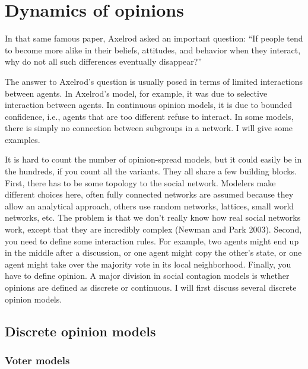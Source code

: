 \documentclass[
  a4paper,
  DIV=11,
  numbers=noendperiod,
  oneside]{scrreprt}
\begin{document}
\hypertarget{sec-Dynamics-of-opinions}{%
\section{Dynamics of opinions}\label{sec-Dynamics-of-opinions}}

In that same famous paper, Axelrod asked an important question: ``If
people tend to become more alike in their beliefs, attitudes, and
behavior when they interact, why do not all such differences eventually
disappear?''

The answer to Axelrod's question is usually posed in terms of limited
interactions between agents. In Axelrod's model, for example, it was due
to selective interaction between agents. In continuous opinion models,
it is due to bounded confidence, i.e., agents that are too different
refuse to interact. In some models, there is simply no connection
between subgroups in a network. I will give some examples.

It is hard to count the number of opinion-spread models, but it could
easily be in the hundreds, if you count all the variants. They all share
a few building blocks. First, there has to be some topology to the
social network. Modelers make different choices here, often fully
connected networks are assumed because they allow an analytical
approach, others use random networks, lattices, small world networks,
etc. The problem is that we don't really know how real social networks
work, except that they are incredibly complex (Newman and Park 2003).
Second, you need to define some interaction rules. For example, two
agents might end up in the middle after a discussion, or one agent might
copy the other's state, or one agent might take over the majority vote
in its local neighborhood. Finally, you have to define opinion. A major
division in social contagion models is whether opinions are defined as
discrete or continuous. I will first discuss several discrete opinion
models.

\hypertarget{sec-Discrete-opinion-models}{%
\subsection{Discrete opinion models}\label{sec-Discrete-opinion-models}}

\hypertarget{sec-Voter-models}{%
\subsubsection{Voter models}\label{sec-Voter-models}}
\end{document}
